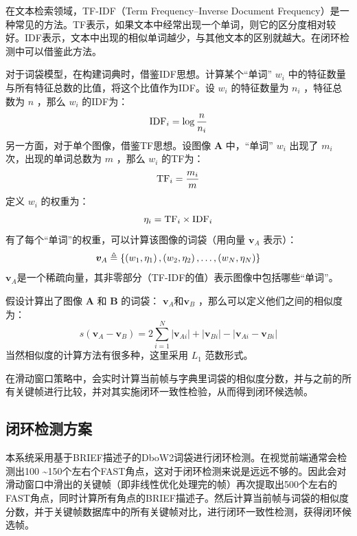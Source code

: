 在文本检索领域，TF-IDF（Term Frequency–Inverse Document Frequency）是一种常见的方法。TF表示，如果文本中经常出现一个单词，则它的区分度相对较好。IDF表示，文本中出现的相似单词越少，与其他文本的区别就越大。在闭环检测中可以借鉴此方法。

对于词袋模型，在构建词典时，借鉴IDF思想。计算某个“单词” $w_i$ 中的特征数量与所有特征总数的比值，将这个比值作为IDF。设 $w_i$ 的特征数量为 $n_i$ ，特征总数为 $n$ ，那么 $w_i$ 的IDF为：
\begin{equation}
\label{eqn:4.29}
\setlength{\abovedisplayskip}{6pt}
\setlength{\belowdisplayskip}{6pt}
\mathrm{IDF}_{i}=\log \frac{n}{n_{i}}
\end{equation}
另一方面，对于单个图像，借鉴TF思想。设图像 $\bm{A} $ 中，“单词” $w_i$ 出现了 $m_i$ 次，出现的单词总数为 $m$ ，那么 $w_i$ 的TF为：
\begin{equation}
\label{eqn:4.30}
\setlength{\abovedisplayskip}{6pt}
\setlength{\belowdisplayskip}{6pt}
\mathrm{TF}_{i}=\frac{m_{i}}{m}
\end{equation}
定义 $w_i$ 的权重为：
\begin{equation}
\label{eqn:4.31}
\setlength{\abovedisplayskip}{6pt}
\setlength{\belowdisplayskip}{6pt}
\eta_{i}=\mathrm{TF}_{i} \times \operatorname{IDF}_{i}
\end{equation}
有了每个“单词”的权重，可以计算该图像的词袋（用向量 $\bm{v}_A $ 表示）：
\begin{equation}
\label{eqn:4.32}
\setlength{\abovedisplayskip}{6pt}
\setlength{\belowdisplayskip}{6pt}
\bm{v}_{A}  \triangleq 
\left\{\left(w_{1}, \eta_{1}\right),\left(w_{2}, \eta_{2}\right), \ldots,\left(w_{N}, \eta_{N}\right)\right\}
\end{equation}
 $\bm{v}_A $是一个稀疏向量，其非零部分（TF-IDF的值）表示图像中包括哪些“单词”。
 
 假设计算出了图像 $\bm{A} $ 和 $\bm{B} $ 的词袋： $\bm{v}_A $和$\bm{v}_B $ ，那么可以定义他们之间的相似度为：
 \begin{equation}
 \label{eqn:4.33}
 s\left(\boldsymbol{v}_{A}-\boldsymbol{v}_{B}\right)=2 \sum_{i=1}^{N}\left|\boldsymbol{v}_{A i}\right|+\left|\boldsymbol{v}_{B i}\right|-\left|\boldsymbol{v}_{A i}-\boldsymbol{v}_{B i}\right|
  \end{equation}
  当然相似度的计算方法有很多种，这里采用 $L_1 $ 范数形式。
  
  在滑动窗口策略中，会实时计算当前帧与字典里词袋的相似度分数，并与之前的所有关键帧进行比较，并对其实施闭环一致性检验，从而得到闭环候选帧。
\subsection{闭环检测方案}
本系统采用基于BRIEF描述子的DboW2词袋进行闭环检测。在视觉前端通常会检测出100 \textasciitilde 150个左右个FAST角点，这对于闭环检测来说是远远不够的。因此会对滑动窗口中滑出的关键帧（即非线性优化处理完的帧）再次提取出500个左右的FAST角点，同时计算所有角点的BRIEF描述子。然后计算当前帧与词袋的相似度分数，并于关键帧数据库中的所有关键帧对比，进行闭环一致性检测，获得闭环候选帧。


